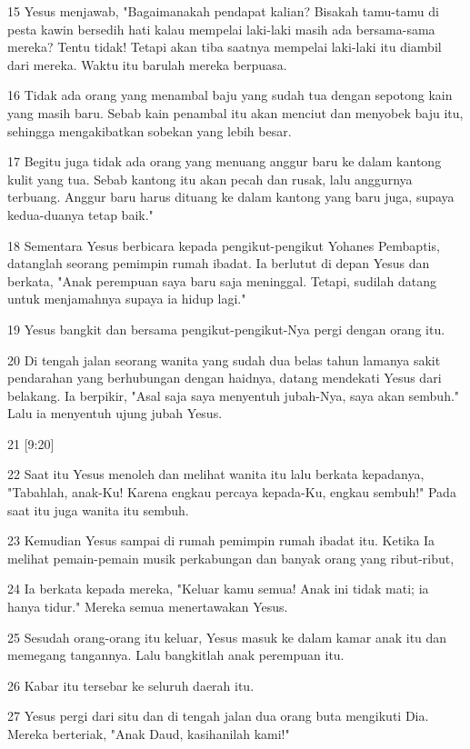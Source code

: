 \par 15 Yesus menjawab, "Bagaimanakah pendapat kalian? Bisakah tamu-tamu di pesta kawin bersedih hati kalau mempelai laki-laki masih ada bersama-sama mereka? Tentu tidak! Tetapi akan tiba saatnya mempelai laki-laki itu diambil dari mereka. Waktu itu barulah mereka berpuasa.
\par 16 Tidak ada orang yang menambal baju yang sudah tua dengan sepotong kain yang masih baru. Sebab kain penambal itu akan menciut dan menyobek baju itu, sehingga mengakibatkan sobekan yang lebih besar.
\par 17 Begitu juga tidak ada orang yang menuang anggur baru ke dalam kantong kulit yang tua. Sebab kantong itu akan pecah dan rusak, lalu anggurnya terbuang. Anggur baru harus dituang ke dalam kantong yang baru juga, supaya kedua-duanya tetap baik."
\par 18 Sementara Yesus berbicara kepada pengikut-pengikut Yohanes Pembaptis, datanglah seorang pemimpin rumah ibadat. Ia berlutut di depan Yesus dan berkata, "Anak perempuan saya baru saja meninggal. Tetapi, sudilah datang untuk menjamahnya supaya ia hidup lagi."
\par 19 Yesus bangkit dan bersama pengikut-pengikut-Nya pergi dengan orang itu.
\par 20 Di tengah jalan seorang wanita yang sudah dua belas tahun lamanya sakit pendarahan yang berhubungan dengan haidnya, datang mendekati Yesus dari belakang. Ia berpikir, "Asal saja saya menyentuh jubah-Nya, saya akan sembuh." Lalu ia menyentuh ujung jubah Yesus.
\par 21 [9:20]
\par 22 Saat itu Yesus menoleh dan melihat wanita itu lalu berkata kepadanya, "Tabahlah, anak-Ku! Karena engkau percaya kepada-Ku, engkau sembuh!" Pada saat itu juga wanita itu sembuh.
\par 23 Kemudian Yesus sampai di rumah pemimpin rumah ibadat itu. Ketika Ia melihat pemain-pemain musik perkabungan dan banyak orang yang ribut-ribut,
\par 24 Ia berkata kepada mereka, "Keluar kamu semua! Anak ini tidak mati; ia hanya tidur." Mereka semua menertawakan Yesus.
\par 25 Sesudah orang-orang itu keluar, Yesus masuk ke dalam kamar anak itu dan memegang tangannya. Lalu bangkitlah anak perempuan itu.
\par 26 Kabar itu tersebar ke seluruh daerah itu.
\par 27 Yesus pergi dari situ dan di tengah jalan dua orang buta mengikuti Dia. Mereka berteriak, "Anak Daud, kasihanilah kami!"
